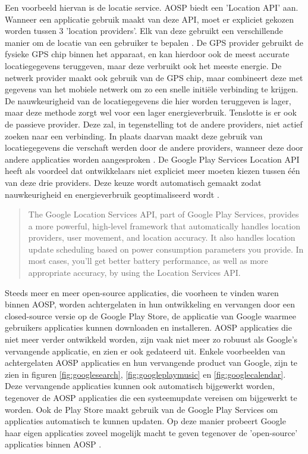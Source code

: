 Een voorbeeld hiervan is de locatie service. AOSP biedt een 'Location API' aan. Wanneer een applicatie gebruik maakt van deze API, moet er expliciet gekozen worden tussen 3 'location providers'. Elk van deze gebruikt een verschillende manier om de locatie van een gebruiker te bepalen \autocite{android_location-strategies}. De GPS provider gebruikt de fysieke GPS chip binnen het apparaat, en kan hierdoor ook de meest accurate locatiegegevens teruggeven, maar deze verbruikt ook het meeste energie. De netwerk provider maakt ook gebruik van de GPS chip, maar combineert deze met gegevens van het mobiele netwerk om zo een snelle initiële verbinding te krijgen. De nauwkeurigheid van de locatiegegevens die hier worden teruggeven is lager, maar deze methode zorgt wel voor een lager energieverbruik. Tenslotte is er ook de passieve provider. Deze zal, in tegenstelling tot de andere providers, niet actief zoeken naar een verbinding. In plaats daarvan maakt deze gebruik van locatiegegevens die verschaft werden door de andere providers, wanneer deze door andere applicaties worden aangesproken \autocite{idris_location-providers}. De Google Play Services Location API heeft als voordeel dat ontwikkelaars niet expliciet meer moeten kiezen tussen één van deze drie providers. Deze keuze wordt automatisch gemaakt zodat nauwkeurigheid en energieverbruik geoptimaliseerd wordt \autocite{android_location-strategies}.

\blockcquote{android_location-strategies}{
    The Google Location Services API, part of Google Play Services, provides a more powerful, high-level framework that automatically handles location providers, user movement, and location accuracy. It also handles location update scheduling based on power consumption parameters you provide. In most cases, you'll get better battery performance, as well as more appropriate accuracy, by using the Location Services API.
}

Steeds meer en meer open-source applicaties, die voorheen te vinden waren binnen AOSP, worden achtergelaten in hun ontwikkeling en vervangen door een closed-source versie op de Google Play Store, de applicatie van Google waarmee gebruikers applicaties kunnen downloaden en installeren. AOSP applicaties die niet meer verder ontwikkeld worden, zijn vaak niet meer zo robuust als Google's vervangende applicatie, en zien er ook gedateerd uit. Enkele voorbeelden van achtergelaten AOSP applicaties en hun vervangende product van Google, zijn te zien in figuren \ref{fig:googlesearch}, \ref{fig:googleplaymusic} en \ref{fig:googlecalendar}. Deze vervangende applicaties kunnen ook automatisch bijgewerkt worden, tegenover de AOSP applicaties die een systeemupdate vereisen om bijgewerkt te worden. Ook de Play Store maakt gebruik van de Google Play Services om applicaties automatisch te kunnen updaten. Op deze manier probeert Google haar eigen applicaties zoveel mogelijk macht te geven tegenover de 'open-source' applicaties binnen AOSP \autocite{amadeo_open-source}.

